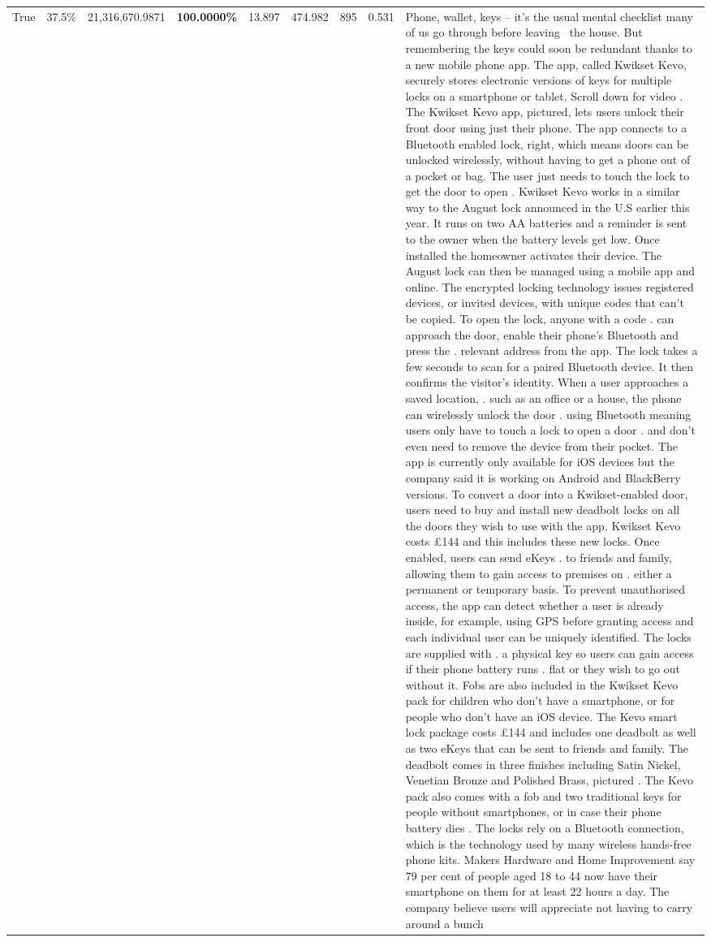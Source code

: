 \begin{table}[H]
\begin{tabular}{lllrlllll}
True & 37.5\% & 21,316,670.9871 & \bfseries \color{red} 100.0000\% & 13.897 & 474.982 & 895 & 0.531 & Phone, wallet, keys – it’s the usual mental checklist many of us go through before leaving  the house. But remembering the keys could soon be redundant thanks to a new mobile phone app. The app, called Kwikset Kevo, securely stores electronic versions of keys for multiple locks on a smartphone or tablet. Scroll down for video . The Kwikset Kevo app, pictured, lets users unlock their front door using just their phone. The app connects to a Bluetooth enabled lock, right, which means doors can be unlocked wirelessly, without having to get a phone out of a pocket or bag. The user just needs to touch the lock to get the door to open . Kwikset Kevo works in a similar way to the August lock announced in the U.S earlier this year. It runs on two AA batteries and a reminder is sent to the owner when the battery levels get low. Once installed the homeowner activates their device. The August lock can then be managed using a mobile app and online. The encrypted locking technology issues registered devices, or invited devices, with unique codes that can't be copied. To open the lock, anyone with a code . can approach the door, enable their phone's Bluetooth and press the . relevant address from the app. The lock takes a few seconds to scan for a paired Bluetooth device. It then confirms the visitor's identity. When a user approaches a saved location, . such as an office or a house, the phone can wirelessly unlock the door . using Bluetooth meaning users only have to touch a lock to open a door . and don't even need to remove the device from their pocket. The app is currently only available for iOS devices but the company said it is working on Android and BlackBerry versions. To convert a door into a Kwikset-enabled door, users need to buy and install new deadbolt locks on all the doors they wish to use with the app. Kwikset Kevo costs £144 and this includes these new locks. Once enabled, users can send eKeys . to friends and family, allowing them to gain access to premises on . either a permanent or temporary basis. To prevent unauthorised access, the app can detect whether a user is already inside, for example, using GPS before granting access and each individual user can be uniquely identified. The locks are supplied with . a physical key so users can gain access if their phone battery runs . flat or they wish to go out without it. Fobs are also included in the Kwikset Kevo pack for children who don't have a smartphone, or for people who don't have an iOS device. The Kevo smart lock package costs £144 and includes one deadbolt as well as two eKeys that can be sent to friends and family. The deadbolt comes in three finishes including Satin Nickel, Venetian Bronze and Polished Brass, pictured . The Kevo pack also comes with a fob and two traditional keys for people without smartphones, or in case their phone battery dies . The locks rely on a Bluetooth connection, which is the technology used by many wireless hands-free phone kits. Makers Hardware and Home Improvement say 79 per cent of people aged 18 to 44 now have their smartphone on them for at least 22 hours a day. The company believe users will appreciate not having to carry around a bunch 
\end{tabular}
\end{table}
